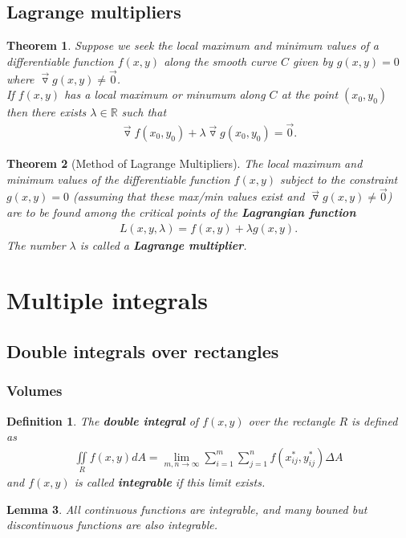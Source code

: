 \documentclass{article}
\theoremstyle{sltheorem}
\newtheorem{definition}{Definition}[section]
\newtheorem{theorem}{Theorem}[section]
\newtheorem{lemma}[theorem]{Lemma}
\newcommand{\R}{\mathbb{R}}
\newcommand{\grad}{\vec\triangledown}
\newcommand{\di}{\iint\limits}
\newcommand*\B[1]{\textbf{#1}}
\begin{document}
\subsection{Lagrange multipliers}
\begin{theorem}
    Suppose we seek the local maximum and minimum values of a differentiable
    function $f(x,y)$ along the smooth curve $C$ given by $g(x,y)=0$ where
    $\grad g(x,y)\not=\vec 0$.\\
    If $f(x,y)$ has a local maximum or minumum along $C$ at the point
    $(x_0, y_0)$ then there exists $\lambda\in\R$ such that
    \begin{align*}
        \grad f(x_0, y_0) + \lambda\grad g(x_0, y_0) = \vec 0.
    \end{align*}
\end{theorem}
\begin{theorem}[Method of Lagrange Multipliers]
    The local maximum and minimum values of the differentiable function
    $f(x,y)$ subject to the constraint $g(x,y)=0$ (assuming that these
    max/min values exist and $\grad g(x,y)\not=\vec 0$) are to be found
    among the critical points of the \B{Lagrangian function}
    \begin{align*}
        L(x,y,\lambda)=f(x,y)+\lambda g(x,y).
    \end{align*} 
    The number $\lambda$ is called a \B{Lagrange multiplier}.
\end{theorem}
\section{Multiple integrals}
\subsection{Double integrals over rectangles}
\subsubsection{Volumes}
\begin{definition}
    The \B{double integral} of $f(x,y)$ over the rectangle $R$ is defined as
    \begin{align*}
        \di_R f(x,y)dA = \lim_{m,n\to\infty}\sum_{i=1}^m\sum_{j=1}^n f(x_{ij}^*, y_{ij}^*)\Delta A
    \end{align*}
    and $f(x,y)$ is called \B{integrable} if this limit exists.
\end{definition}
\begin{lemma}
    All continuous functions are integrable, and many bouned but
    discontinuous functions are also integrable.
\end{lemma}
\end{document}
